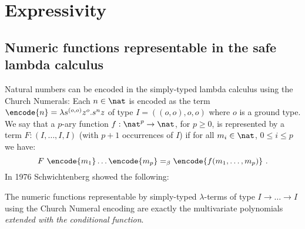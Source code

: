 \allowdisplaybreaks

\section{Expressivity}
\subsection{Numeric functions representable in the safe lambda
calculus}

Natural numbers can be encoded in the simply-typed lambda calculus
using the Church Numerals: Each $n\in\nat$ is encoded as the term
$\encode{n} = \lambda s^{(o,o)} z^o. s^n z$ of type $I = ((o,o),o,o)$ where
$o$ is a ground type.
We say that a $p$-ary function $f : \nat^p \rightarrow \nat$, for $p \geq 0$,
is represented by a term $F : (I, \ldots, I, I)$ (with $p+1$ occurrences of $I$)
if for all $m_i \in \nat$, $0\leq i\leq p$ we have:
$$F~\encode{m_1} \ldots \encode{m_p} =_\beta \encode{f(m_1,\ldots, m_p)} \ .$$
In 1976 Schwichtenberg \cite{citeulike:622637}
showed the following:


\begin{theorem}[Schwichtenberg 1976]
The numeric functions representable by simply-typed $\lambda$-terms
of type $I\rightarrow \ldots \rightarrow I$ using the Church Numeral
encoding are exactly the multivariate polynomials \emph{extended
with the conditional function}.
\end{theorem}

